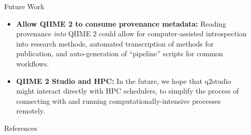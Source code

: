 \documentclass[final]{beamer}
\newlength{\sepwidth}
\newlength{\colwidth}
\newcommand{\separatorcolumn}{\begin{column}{\sepwidth}\end{column}}
\begin{document}
\begin{frame}[t]
\begin{columns}[t]
\begin{column}{\colwidth}
\begin{block}{Future Work}
    \begin{itemize}
      \item \textbf{Allow QIIME 2 to consume provenance metadata:} Reading
      provenance \textit{into} QIIME 2 could allow for computer-assisted
      introspection into research methods, automated transcription of methods
      for publication, and auto-generation of “pipeline” scripts for common workflows.
      \item \textbf{QIIME 2 Studio and HPC:} In the future, we hope that q2studio might interact
      directly with HPC schedulers, to simplify the process of connecting with
      and running computationally-intensive processes remotely.
    \end{itemize}

  \end{block}

  \begin{block}{References}

    \nocite{*}
    \footnotesize{}

  \end{block}

\end{column}

\separatorcolumn
\end{columns}
\end{frame}
\end{document}
